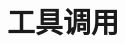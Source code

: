\setcounter{chapter}{23}

\hypertarget{ux5de5ux5177ux8c03ux7528}{%
\chapter{工具调用}\label{ux5de5ux5177ux8c03ux7528}}
